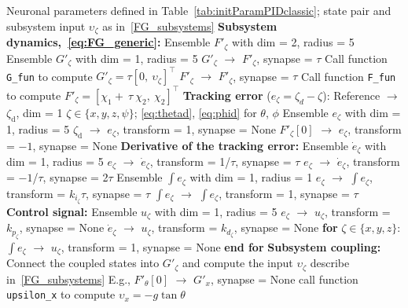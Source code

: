 \documentclass[conference]{IEEEtran}
\begin{document}
\begin{algorithm}[!h] 
\small{
\caption{\small Neural implementation template for a generic subsystem $\zeta\in\{z,x,\theta,y,\phi,\psi\}$ with PID/PD control.}
\label{Algoritmo-PID-classic}
\begin{algorithmic}
\Require Neuronal parameters defined in Table~\ref{tab:initParamPIDclassic}; state pair and subsystem input $\upsilon_\zeta$ as in~\eqref{FG_subsystems}
\State \textbf{Subsystem dynamics,~\eqref{eq:FG_generic}:}
\State \quad Ensemble $F'_\zeta$ with dim = 2, radius = 5
\State \quad Ensemble $G'_\zeta$ with dim = 1, radius = 5
\State \quad $G'_\zeta$ $\to$ $F'_\zeta$, synapse = $\tau$
\State \quad Call function \texttt{G\_fun} to compute $G'_\zeta=\tau [0,\ \upsilon_\zeta]^\top$
\State \quad $F'_\zeta$ $\to$ $F'_\zeta$, synapse = $\tau$
\State \quad Call function \texttt{F\_fun} to compute  $F'_\zeta=[\chi_1 +~\tau~\chi_2,\ \chi_2]^\top$
\State \textbf{Tracking error} ($e_\zeta=\zeta_d-\zeta$):
\State \quad Reference $\to$ $\zeta_\text{d}$, dim = 1   
\State \quad \quad $\zeta\in\{x,y,z,\psi\}$; \eqref{eq:thetad}, \eqref{eq:phid} for $\theta$, $\phi$
\State \quad Ensemble $e_\zeta$ with dim = 1, radius = 5
\State \quad $\zeta_\text{d}$ $\to$ $e_\zeta$, transform = 1, synapse = None
\State \quad $F'_\zeta[0]$ $\to$ $e_\zeta$, transform = $-1$, synapse = None
\State \textbf{Derivative of the tracking error:}
\State \quad Ensemble $\dot e_\zeta$ with dim = 1, radius = 5
\State \quad $e_\zeta$ $\to$ $\dot e_\zeta$, transform = 1/$\tau$, synapse = $\tau$
\State \quad $e_\zeta$ $\to$ $\dot e_\zeta$, transform = $-1$/$\tau$, synapse = 2$\tau$
 
\State \quad Ensemble $\int e_\zeta$ with dim = 1, radius = 1
\State \quad $e_\zeta$ $\to$ $\int e_\zeta$, transform = $k_{i_\zeta} \tau$, synapse = $\tau$
\State \quad $\int e_\zeta$ $\to$ $\int e_\zeta$, transform = 1, synapse = $\tau$
\EndFor
\State \textbf{Control signal:}
\State \quad Ensemble $u_\zeta$ with dim = 1, radius = 5
\State \quad $e_\zeta$ $\to$ $u_\zeta$, transform = $k_{p_\zeta}$, synapse = None
\State \quad $\dot e_\zeta$ $\to$ $u_\zeta$, transform = $k_{d_\zeta}$, synapse = None
\State \quad \textbf{for} $\zeta\in\{x,y,z\}$:
\State \quad \quad  $\int e_\zeta$ $\to$ $u_\zeta$, transform = 1, synapse = None
\State \quad \textbf{end for}
\State \textbf{Subsystem coupling:}
\State \quad Connect the coupled states into $G'_\zeta$ and compute 
\State \quad the input $\upsilon_\zeta$ describe in~\eqref{FG_subsystems} 
\State \quad E.g., $F'_{\theta}[0]$ $\to$ $G'_x$, synapse = None
\State \quad call function \texttt{upsilon\_x} to compute 
 $\upsilon_x=-g\tan \theta$ %
\EndWhile

\end{algorithmic}
}
\end{algorithm}
\end{document}

